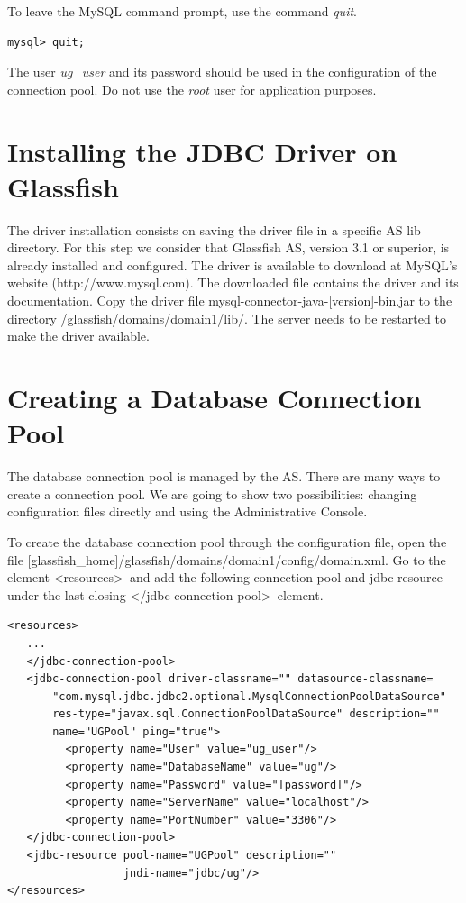 \documentclass[envcountsame,envcountchap]{svmono}
\begin{document}
To leave the MySQL command prompt, use the command \textit{quit}.

\begin{verbatim}
mysql> quit;
\end{verbatim}

The user \textit{ug\_user} and its password should be used in the configuration of the connection pool. Do not use the \textit{root} user for application purposes.

\section{Installing the JDBC Driver on Glassfish}

The driver installation consists on saving the driver file in a specific AS lib directory. For this step we consider that Glassfish AS, version 3.1 or superior, is already installed and configured. The driver is available to download at MySQL's website (http://www.mysql.com). The downloaded file contains the driver and its documentation. Copy  the driver file mysql-connector-java-[version]-bin.jar to the directory /glassfish/domains/domain1/lib/. The server needs to be restarted to make the driver available.

\section{Creating a Database Connection Pool}
\label{sec:creating-database-connection-pool}

The database connection pool is managed by the AS. There are many ways to create a connection pool. We are going to show two possibilities: changing configuration files directly and using the Administrative Console.

To create the database connection pool through the configuration file, open the file [glassfish\_home]/glassfish/domains/domain1/config/domain.xml. Go to the element \textless resources\textgreater \ and add the following connection pool and jdbc resource under the last closing \textless /jdbc-connection-pool\textgreater \ element.

\begin{verbatim}
<resources>
   ...
   </jdbc-connection-pool>
   <jdbc-connection-pool driver-classname="" datasource-classname=
       "com.mysql.jdbc.jdbc2.optional.MysqlConnectionPoolDataSource"
       res-type="javax.sql.ConnectionPoolDataSource" description="" 
       name="UGPool" ping="true">
         <property name="User" value="ug_user"/>
         <property name="DatabaseName" value="ug"/>
         <property name="Password" value="[password]"/>
         <property name="ServerName" value="localhost"/>
         <property name="PortNumber" value="3306"/>
   </jdbc-connection-pool>
   <jdbc-resource pool-name="UGPool" description="" 
                  jndi-name="jdbc/ug"/>
</resources>
\end{verbatim}
\end{document}
